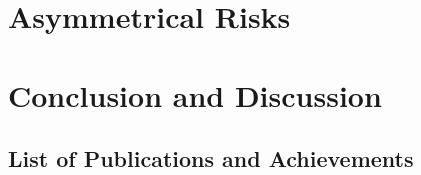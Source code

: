 \documentclass[12pt]{report}
\begin{document}
	
	\chapter{Asymmetrical Risks}
	\label{ch:asymmetrical_risks}
	
	
	
	\chapter{Conclusion and Discussion}
	\label{ch:conclusion_and_discussion}
	
	
	
	
	\clearpage
	\renewcommand{\bibname}{References}
	
	
	
	\begin{appendices}
		\chapter{List of Publications and Achievements}
		\label{app:list_of_publications}
		
		
		
	\end{appendices}
	
\end{document}
